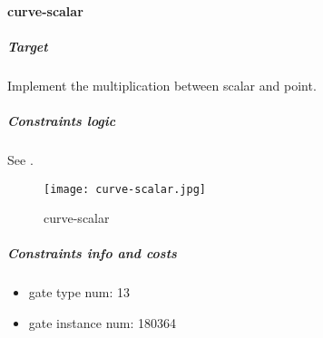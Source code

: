 \paragraph{curve-scalar}

\subparagraph{Target}
Implement the multiplication between scalar and point.

\subparagraph{Constraints logic}
See .
\begin{figure}[!ht]
    \centering
    \texttt{[image: curve-scalar.jpg]}
    \caption{curve-scalar}
    \label{fig:curve-scalar}
\end{figure}

\subparagraph{Constraints info and costs}
\begin{itemize}
    \item gate type num: 13 
    \item gate instance num: 180364          
\end{itemize}
